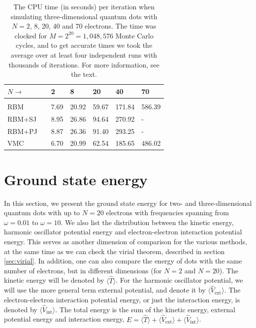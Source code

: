 \begin{table}[H]
	\caption{The CPU time (in seconds) per iteration when simulating three-dimensional quantum dots with $N=2$, 8, 20, 40 and 70 electrons. The time was clocked for $M=2^{20}=1,048,576$ Monte Carlo cycles, and to get accurate times we took the average over at least four independent runs with thousands of iterations. For more information, see the text.}
	\label{tab:cputime3D}
	\begin{tabularx}{\textwidth}{lrR{2.1cm}R{2.1cm}R{2.1cm}R{2.1cm}R{2.1cm}} \hline\hline
		$N\rightarrow$ & \makecell{\\ \phantom{=}} & 2 & 8 & 20 & 40 & 70 \\ \hline \\
		RBM && 7.69 & 20.92 & 59.67 & 171.84 & 586.39 \\
		RBM+SJ && 8.95 & 26.86 & 94.64 & 270.92 & - \\
		RBM+PJ && 8.87 & 26.36 & 91.40 & 293.25 & - \\
		VMC && 6.70 & 20.99 & 62.54 & 185.65 & 486.02 \\ \hline \hline
	\end{tabularx}
\end{table}

\section{Ground state energy} \label{sec:energydistribution}
In this section, we present the ground state energy for two- and three-dimensional quantum dots with up to $N=20$ electrons with frequencies spanning from $\omega=0.01$ to $\omega=10$. We also list the distribution between the kinetic energy, harmonic oscillator potential energy and electron-electron interaction potential energy. This serves as another dimension of comparison for the various methods, at the same time as we can check the virial theorem, described in section \ref{sec:virial}. In addition, one can also compare the energy of dots with the same number of electrons, but in different dimensions (for $N=2$ and $N=20$). The kinetic energy will be denoted by $\langle\hat{T}\rangle$. For the harmonic oscillator potential, we will use the more general term external potential, and denote it by $\langle\hat{V}_{\text{ext}}\rangle$. The electron-electron interaction potential energy, or just the interaction energy, is denoted by $\langle\hat{V}_{\text{int}}\rangle$. The total energy is the sum of the kinetic energy, external potential energy and interaction energy, $E=\langle\hat{T}\rangle+\langle\hat{V}_{\text{ext}}\rangle+\langle\hat{V}_{\text{int}}\rangle$.

